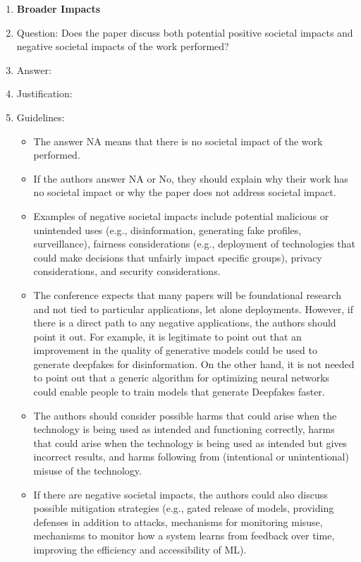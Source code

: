 \documentclass{article}
\begin{document}
\begin{enumerate}
\item {\bf Broader Impacts}
    \item[] Question: Does the paper discuss both potential positive societal impacts and negative societal impacts of the work performed?
    \item[] Answer: \answerTODO{} %
    \item[] Justification: \justificationTODO{}
    \item[] Guidelines:
    \begin{itemize}
        \item The answer NA means that there is no societal impact of the work performed.
        \item If the authors answer NA or No, they should explain why their work has no societal impact or why the paper does not address societal impact.
        \item Examples of negative societal impacts include potential malicious or unintended uses (e.g., disinformation, generating fake profiles, surveillance), fairness considerations (e.g., deployment of technologies that could make decisions that unfairly impact specific groups), privacy considerations, and security considerations.
        \item The conference expects that many papers will be foundational research and not tied to particular applications, let alone deployments. However, if there is a direct path to any negative applications, the authors should point it out. For example, it is legitimate to point out that an improvement in the quality of generative models could be used to generate deepfakes for disinformation. On the other hand, it is not needed to point out that a generic algorithm for optimizing neural networks could enable people to train models that generate Deepfakes faster.
        \item The authors should consider possible harms that could arise when the technology is being used as intended and functioning correctly, harms that could arise when the technology is being used as intended but gives incorrect results, and harms following from (intentional or unintentional) misuse of the technology.
        \item If there are negative societal impacts, the authors could also discuss possible mitigation strategies (e.g., gated release of models, providing defenses in addition to attacks, mechanisms for monitoring misuse, mechanisms to monitor how a system learns from feedback over time, improving the efficiency and accessibility of ML).
    \end{itemize}
    

\end{enumerate}
\end{document}
